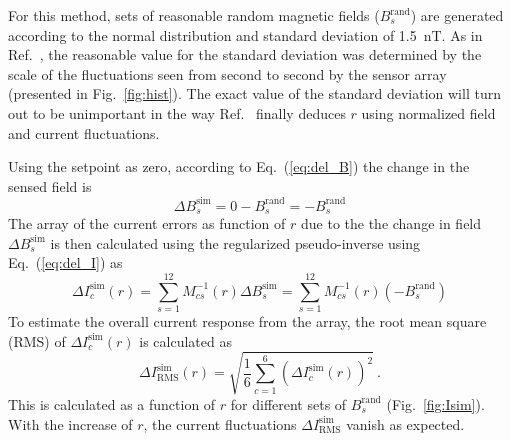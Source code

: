 For this method, sets of reasonable random magnetic fields ($B_s^{\text{rand}}$) are generated according to the normal distribution and standard deviation of 1.5~nT. As in Ref.~\cite{bea}, the reasonable value for the standard deviation was determined by the scale of the fluctuations seen from second to second by the sensor array (presented in Fig.~\ref{fig:hist}). The exact value of the standard deviation will turn out to be unimportant in the way Ref.~\cite{bea} finally deduces $r$ using normalized field and current fluctuations.

Using the setpoint as zero, according to Eq.~(\ref{eq:del_B}) the change in the sensed field is  
\begin{equation}\label{eq:del_Bs}
    \Delta B_s^{\text{sim}} = 0 - B_s^{\text{rand}}=-B_s^{\text{rand}}
\end{equation}
The array of the current errors  as function of $r$ due to the the change in field $\Delta B_s^{\text{sim}}$ is then calculated using the regularized pseudo-inverse using Eq.~(\ref{eq:del_I}) as
\begin{equation}\label{eq:del_Is}
    \Delta I_c^{\text{sim}}(r) =\sum_{s=1}^{12} M^{-1}_{cs}(r) \Delta B_s^{\text{sim}}=\sum_{s=1}^{12} M^{-1}_{cs}(r) (-B_s^{\text{rand}})
\end{equation}
To estimate the overall current response from the array, the root mean square (RMS) of $\Delta I_c^{\text{sim}}(r)$ is calculated as
\begin{equation}\label{eq:delta_Isim_rms}
     \Delta I_{\text{RMS}}^{\text{sim}}(r)= \sqrt{\frac{1}{6}\sum_{c=1}^6 (\Delta I_c^{\text{sim}}(r))^2}~\text{.}
\end{equation}
This is calculated as a function of $r$ for different sets of $B_s^{\text{rand}}$ (Fig.~\ref{fig:Isim}). With the increase of $r$, the current fluctuations $\Delta I_{\text{RMS}}^{\text{sim}}$ vanish as expected.




